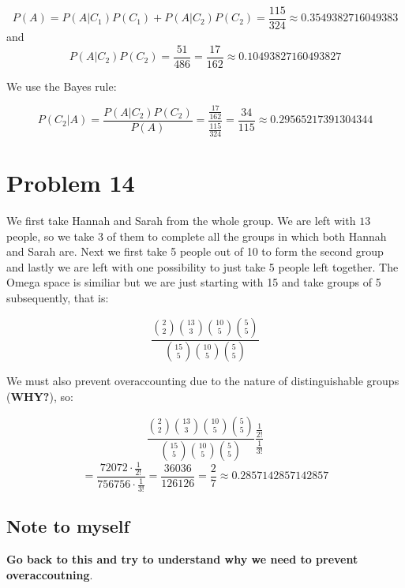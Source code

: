 \documentclass{article}
\begin{document}
\begin{equation*}
    P(A) = P(A|C_1)P(C_1) + P(A|C_2)P(C_2) = \frac{115}{324} \approx 0.3549382716049383
\end{equation*}
and
\begin{equation*}
    P(A|C_2)P(C_2) = \frac{51}{486} = \frac{17}{162} \approx 0.10493827160493827
\end{equation*}

We use the Bayes rule:

\begin{equation*}
    P(C_{2}|A) = \frac{P(A|C_2)P(C_2)}{P(A)} = \frac{\frac{17}{162}}{\frac{115}{324}} = \frac{34}{115} \approx 0.29565217391304344
\end{equation*}


\section*{Problem 14}

We first take Hannah and Sarah from the whole group. We are left with \(13\) people, so we
take 3 of them to complete all the groups in which both Hannah and Sarah are. Next we first take
5 people out of 10 to form the second group and lastly we are left with one possibility to just
take 5 people left together. The Omega space is similiar but we are just starting with 15 and take groups
of 5 subsequently, that is:

\begin{equation*}
    \frac{\binom{2}{2}\binom{13}{3}\binom{10}{5}\binom{5}{5}}{\binom{15}{5}\binom{10}{5}\binom{5}{5}}
\end{equation*}

We must also prevent overaccounting due to the nature of distinguishable groups (\textbf{WHY?}), so:

\begin{equation*}
    \frac{\binom{2}{2}\binom{13}{3}\binom{10}{5}\binom{5}{5}}{\binom{15}{5}\binom{10}{5}\binom{5}{5}}\frac{\frac{1}{2!}}{\frac{1}{3!}}
\end{equation*}
\begin{equation*}
    = \frac{72072 \cdot \frac{1}{2!}}{756756 \cdot \frac{1}{3!}} = \frac{36036}{126126} = \frac{2}{7} \approx 0.2857142857142857 
\end{equation*}

\subsection*{Note to myself}
\textbf{Go back to this and try to understand why we need to prevent overaccoutning}.
\end{document}
